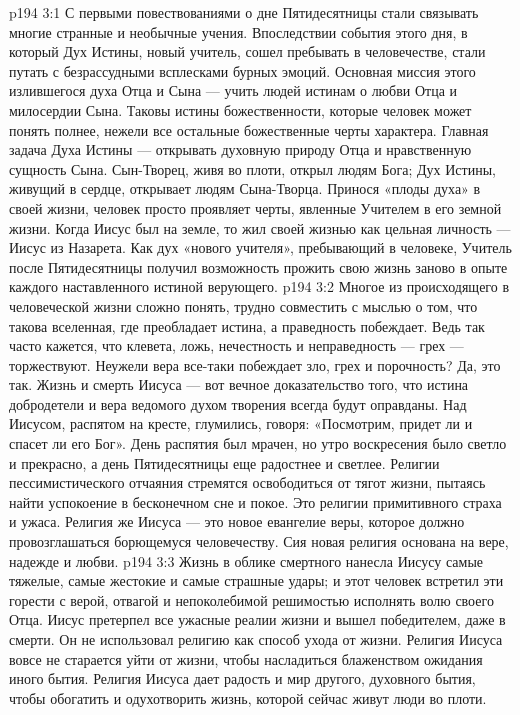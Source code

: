 \vs p194 3:1 С первыми повествованиями о дне Пятидесятницы стали связывать многие странные и необычные учения. Впоследствии события этого дня, в который Дух Истины, новый учитель, сошел пребывать в человечестве, стали путать с безрассудными всплесками бурных эмоций. Основная миссия этого излившегося духа Отца и Сына --- учить людей истинам о любви Отца и милосердии Сына. Таковы истины божественности, которые человек может понять полнее, нежели все остальные божественные черты характера. Главная задача Духа Истины --- открывать духовную природу Отца и нравственную сущность Сына. Сын\hyp{}Творец, живя во плоти, открыл людям Бога; Дух Истины, живущий в сердце, открывает людям Сына\hyp{}Творца. Принося «плоды духа» в своей жизни, человек просто проявляет черты, явленные Учителем в его земной жизни. Когда Иисус был на земле, то жил своей жизнью как цельная личность --- Иисус из Назарета. Как дух «нового учителя», пребывающий в человеке, Учитель после Пятидесятницы получил возможность прожить свою жизнь заново в опыте каждого наставленного истиной верующего.
\vs p194 3:2 Многое из происходящего в человеческой жизни сложно понять, трудно совместить с мыслью о том, что такова вселенная, где преобладает истина, а праведность побеждает. Ведь так часто кажется, что клевета, ложь, нечестность и неправедность --- грех --- торжествуют. Неужели вера все\hyp{}таки побеждает зло, грех и порочность? Да, это так. Жизнь и смерть Иисуса --- вот вечное доказательство того, что истина добродетели и вера ведомого духом творения всегда будут оправданы. Над Иисусом, распятом на кресте, глумились, говоря: «Посмотрим, придет ли и спасет ли его Бог». День распятия был мрачен, но утро воскресения было светло и прекрасно, а день Пятидесятницы еще радостнее и светлее. Религии пессимистического отчаяния стремятся освободиться от тягот жизни, пытаясь найти успокоение в бесконечном сне и покое. Это религии примитивного страха и ужаса. Религия же Иисуса --- это новое евангелие веры, которое должно провозглашаться борющемуся человечеству. Сия новая религия основана на вере, надежде и любви.
\vs p194 3:3 Жизнь в облике смертного нанесла Иисусу самые тяжелые, самые жестокие и самые страшные удары; и этот человек встретил эти горести с верой, отвагой и непоколебимой решимостью исполнять волю своего Отца. Иисус претерпел все ужасные реалии жизни и вышел победителем, даже в смерти. Он не использовал религию как способ ухода от жизни. Религия Иисуса вовсе не старается уйти от жизни, чтобы насладиться блаженством ожидания иного бытия. Религия Иисуса дает радость и мир другого, духовного бытия, чтобы обогатить и одухотворить жизнь, которой сейчас живут люди во плоти.
